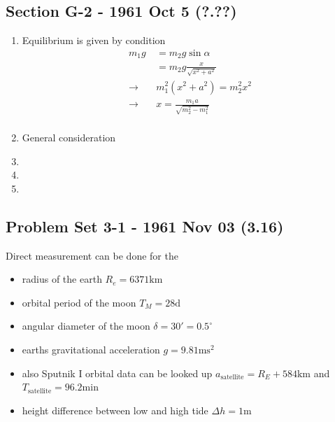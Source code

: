\documentclass[10pt,a4paper]{book}
\theoremstyle{definition}
\begin{document}
\subsection{Section G-2 - 1961 Oct 5 (?.??)}
\begin{enumerate}
    \item Equilibrium is given by condition
    \begin{align}
        m_1g&=m_2g\sin\alpha\\
        &=m_2g\frac{x}{\sqrt{x^2+a^2}}\\
        \rightarrow\quad& m_1^2(x^2+a^2)=m_2^2 x^2\\
        \rightarrow\quad& x=\frac{m_1 a}{\sqrt{m_2^2-m_1^2}}\\
    \end{align}
    \item General consideration
    \begin{center}
    \end{center}
    
    \item
    \item
    \item
\end{enumerate}

\subsection{Problem Set 3-1 - 1961 Nov 03 (3.16)}
Direct measurement can be done for the
\begin{itemize}
    \item radius of the earth $R_e=6371\text{km}$
    \item orbital period of the moon $T_M=28\text{d}$
    \item angular diameter of the moon $\delta=30'=0.5^\circ$
    \item earths gravitational acceleration $g=9.81\text{ms}^2$
    \item also Sputnik I orbital data can be looked up $a_\text{satellite}=R_E+584\text{km}$ and $T_\text{satellite}=96.2\text{min}$
    \item height difference between low and high tide $\Delta h=1\text{m}$
\end{itemize}
\end{document}
